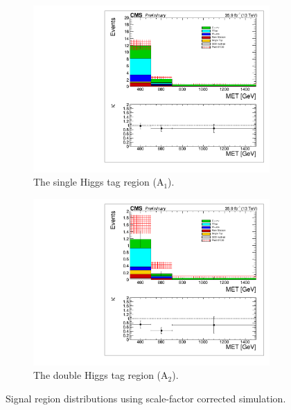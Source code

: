 \begin{figure}
\centering
\begin{subfigure}[b]{0.49\textwidth}
\centering
\includegraphics[trim={5px 5px 5px 5px},clip,width=0.99\textwidth]{figs/MCclosureSF_singleHiggsRegionTotal.pdf}
\caption{The single Higgs tag region (A$_{1}$).}
\end{subfigure}
\begin{subfigure}[b]{0.49\textwidth}
\centering
\includegraphics[trim={5px 5px 5px 5px},clip,width=0.99\textwidth]{figs/MCclosureSF_doubleHiggsRegionTotal.pdf} 
\caption{The double Higgs tag region (A$_{2}$).}
\end{subfigure}
\caption{Signal region \ptmiss distributions using scale-factor corrected simulation.}
\label{fig:MCclosuresf}
\end{figure}


